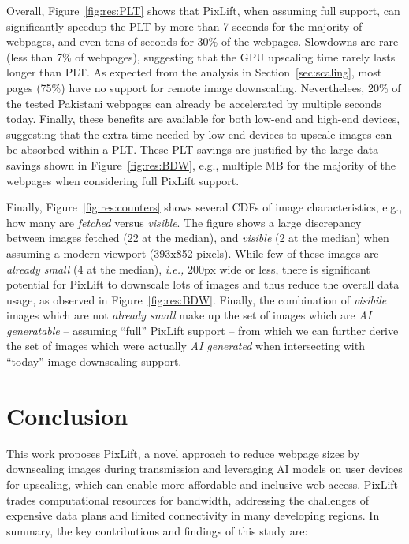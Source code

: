 \documentclass[acmsmall]{acmart}
\newcommand{\tool}{{PixLift}\xspace}
\newcommand{\eg}{{e.g.,}\xspace}
\newcommand{\ie}{{\it i.e.,}\xspace}
\begin{document}
Overall, Figure~\ref{fig:res:PLT} shows that \tool, when assuming full support, can significantly speedup the PLT by more than 7 seconds for the majority of webpages, and even tens of seconds for 30\% of the webpages. Slowdowns are rare (less than 7\% of webpages), suggesting that the GPU upscaling time rarely lasts longer than PLT. As expected from the analysis in Section~\ref{sec:scaling}, most pages (75\%) have no support for remote image downscaling. Neverthelees, 20\% of the tested Pakistani webpages can already be accelerated by multiple seconds today. Finally, these benefits are available for both low-end and high-end devices, suggesting that the extra time needed by low-end devices to upscale images can be absorbed within a PLT. These PLT savings are justified by the large data savings shown in Figure~\ref{fig:res:BDW}, \eg multiple MB for the majority of the webpages when considering full \tool support. 

Finally, Figure~\ref{fig:res:counters} shows several CDFs of image characteristics, \eg how many are \textit{fetched} versus \textit{visible}. The figure shows a large discrepancy between images fetched (22 at the median), and \textit{visible} (2 at the median) when assuming a modern viewport (393x852 pixels). While few of these images are \textit{already small} (4 at the median), \ie 200px wide or less, there is significant potential for \tool to downscale lots of images and thus reduce the overall data usage, as observed in Figure~\ref{fig:res:BDW}. Finally, the combination of \textit{visibile} images which are not \textit{already small} make up the set of images which are \textit{AI generatable} -- assuming ``full'' \tool support --  from which we can further derive the set of images which were actually \textit{AI generated} when intersecting with ``today'' image downscaling support. 

\section{Conclusion}

This work proposes \tool, a novel approach to reduce webpage sizes by downscaling images during transmission and leveraging AI models on user devices for upscaling, which can enable more affordable and inclusive web access. \tool trades computational resources for bandwidth, addressing the challenges of expensive data plans and limited connectivity in many developing regions.
In summary, the key contributions and findings of this study are:
\end{document}
